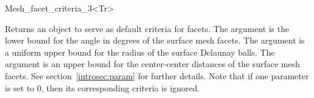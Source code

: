 \begin{ccRefFunctionObjectClass}{Mesh_facet_criteria_3<Tr>}
\ccTypes


\ccCreation
{}  %

{Returns an object to serve as default criteria for facets. The argument 
 is the lower bound for the angle in degrees of the
surface mesh facets. The argument  is a uniform upper bound
for the radius of the surface Delaunay balls. The argument
 is an upper bound for the center-center distances
of the surface mesh facets. See
section~\ref{introsec:param} for further details.
Note that if one parameter is set to 0, then its corresponding criteria is ignored.}



\ccSeeAlso

 \\
 \\
 \\




\end{ccRefFunctionObjectClass}

\ccRefPageEnd
